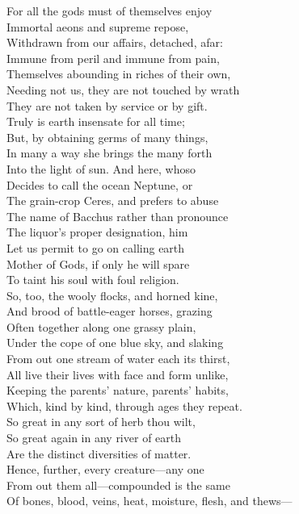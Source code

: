 For all the gods must of themselves enjoy\\
Immortal aeons and supreme repose,\\
Withdrawn from our affairs, detached, afar:\\
Immune from peril and immune from pain,\\
Themselves abounding in riches of their own,\\
Needing not us, they are not touched by wrath\\
They are not taken by service or by gift.\\
Truly is earth insensate for all time;\\
But, by obtaining germs of many things,\\
In many a way she brings the many forth\\
Into the light of sun. And here, whoso\\
Decides to call the ocean Neptune, or\\
The grain-crop Ceres, and prefers to abuse\\
The name of Bacchus rather than pronounce\\
The liquor's proper designation, him\\
Let us permit to go on calling earth\\
Mother of Gods, if only he will spare\\
To taint his soul with foul religion.\\
So, too, the wooly flocks, and horned kine,\\
And brood of battle-eager horses, grazing\\
Often together along one grassy plain,\\
Under the cope of one blue sky, and slaking\\
From out one stream of water each its thirst,\\
All live their lives with face and form unlike,\\
Keeping the parents' nature, parents' habits,\\
Which, kind by kind, through ages they repeat.\\
So great in any sort of herb thou wilt,\\
So great again in any river of earth\\
Are the distinct diversities of matter.\\
Hence, further, every creature—any one\\
From out them all—compounded is the same\\
Of bones, blood, veins, heat, moisture, flesh, and thews—\\
